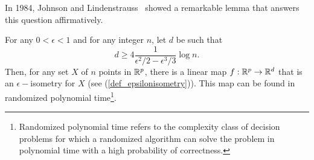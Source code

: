 In 1984, Johnson and Lindenstrauss~\cite{Johnson_Lindenstrauss_84} showed a remarkable lemma that answers this question affirmatively.

\begin{theorem}\label{JL_random_0}
 For any $0<\epsilon<1$ and for any integer $n$, let $d$ be such that
 \begin{equation}\label{kdim}
 d \geq 4\frac1{\epsilon^2/2 - \epsilon^3/3}\log n.
\end{equation}
Then, for any set $X$ of $n$ points in $\mathbb{R}^p$, there is a linear map $f:\mathbb{R}^p\to\mathbb{R}^d$ that is an $\epsilon-$isometry for $X$ (see (\ref{def_epsilonisometry})).
This map can be found in randomized polynomial time\footnote{Randomized polynomial time refers to the complexity class of decision problems for which a randomized algorithm can solve the problem in polynomial time with a high probability of correctness.}.
\end{theorem}



